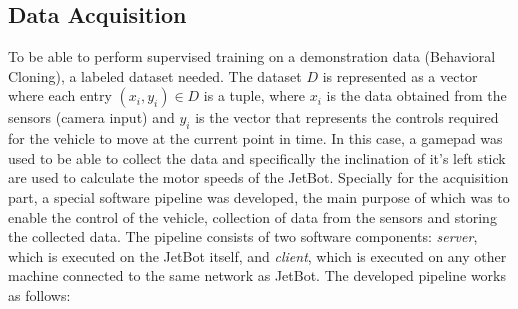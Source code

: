 \subsection{Data Acquisition}

To be able to perform supervised training on a demonstration data (Behavioral Cloning), a labeled dataset needed. The dataset $D$ is represented as a vector where each entry $(x_i, y_i) \in D$ is a tuple, where $x_i$ is the data obtained from the sensors (camera input) and $y_i$ is the vector that represents the controls required for the vehicle to move at the current point in time. In this case, a gamepad was used to be able to collect the data and specifically the inclination of it's left stick are used to calculate the motor speeds of the JetBot. Specially for the acquisition part, a special software pipeline was developed, the main purpose of which was to enable the control of the vehicle, collection of data from the sensors and storing the collected data. The pipeline consists of two software components: \textit{server}, which is executed on the JetBot itself, and \textit{client}, which is executed on any other machine connected to the same network as JetBot. The developed pipeline works as follows:

